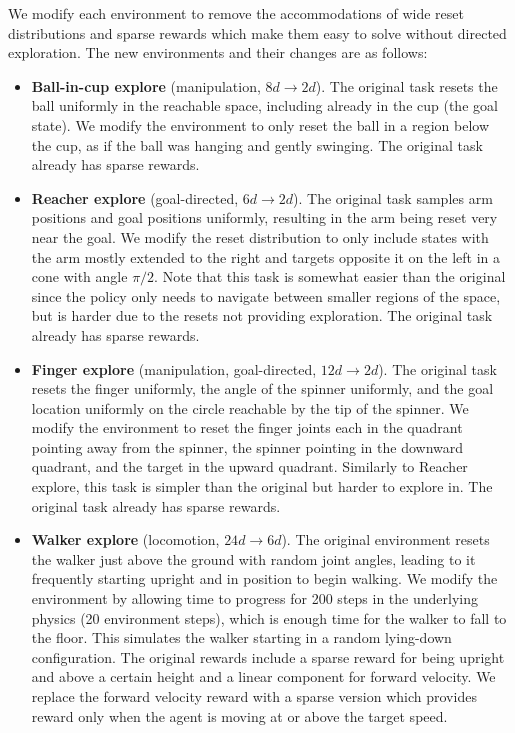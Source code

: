 We modify each environment to remove the accommodations of wide reset distributions and sparse rewards which make them easy to solve without directed exploration.
The new environments and their changes are as follows:
\begin{itemize}
    \item \textbf{Ball-in-cup explore} (manipulation, $8d \rightarrow 2d$). The original task resets the ball uniformly in the reachable space, including already in the cup (the goal state).
    We modify the environment to only reset the ball in a region below the cup, as if the ball was hanging and gently swinging.
    The original task already has sparse rewards.
    \item \textbf{Reacher explore} (goal-directed, $6d \rightarrow 2d$).
    The original task samples arm positions and goal positions uniformly, resulting in the arm being reset very near the goal.
    We modify the reset distribution to only include states with the arm mostly extended to the right and targets opposite it on the left in a cone with angle $\pi/2$.
    Note that this task is somewhat easier than the original since the policy only needs to navigate between smaller regions of the space, but is harder due to the resets not providing exploration.
    The original task already has sparse rewards.
    \item \textbf{Finger explore} (manipulation, goal-directed, $12d \rightarrow 2d$).
    The original task resets the finger uniformly, the angle of the spinner uniformly, and the goal location uniformly on the circle reachable by the tip of the spinner.
    We modify the environment to reset the finger joints each in the quadrant pointing away from the spinner, the spinner pointing in the downward quadrant, and the target in the upward quadrant.
    Similarly to Reacher explore, this task is simpler than the original but harder to explore in.
    The original task already has sparse rewards.
    \item \textbf{Walker explore} (locomotion, $24d \rightarrow 6d$).
    The original environment resets the walker just above the ground with random joint angles, leading to it frequently starting upright and in position to begin walking.
    We modify the environment by allowing time to progress for 200 steps in the underlying physics (20 environment steps), which is enough time for the walker to fall to the floor.
    This simulates the walker starting in a random lying-down configuration.
    The original rewards include a sparse reward for being upright and above a certain height and a linear component for forward velocity.
    We replace the forward velocity reward with a sparse version which provides reward only when the agent is moving at or above the target speed.
\end{itemize}

